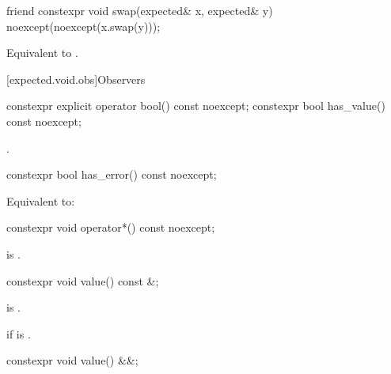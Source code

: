%
\begin{itemdecl}
friend constexpr void swap(expected& x, expected& y) noexcept(noexcept(x.swap(y)));
\end{itemdecl}

\begin{itemdescr}
\pnum
\effects
Equivalent to .
\end{itemdescr}

[expected.void.obs]{Observers}

%
%
\begin{itemdecl}
constexpr explicit operator bool() const noexcept;
constexpr bool has_value() const noexcept;
\end{itemdecl}

\begin{itemdescr}
\pnum
\returns
{}.
\end{itemdescr}

%
\begin{itemdecl}
constexpr bool has_error() const noexcept;
\end{itemdecl}

\begin{itemdescr}
\pnum
\effects
Equivalent to:
\end{itemdescr}

%
\begin{itemdecl}
constexpr void operator*() const noexcept;
\end{itemdecl}

\begin{itemdescr}
\pnum
\hardexpects
{} is .
\end{itemdescr}

%
\begin{itemdecl}
constexpr void value() const &;
\end{itemdecl}

\begin{itemdescr}
\pnum
\mandates
{} is .

\pnum
\throws
{} if  is .
\end{itemdescr}

%
\begin{itemdecl}
constexpr void value() &&;
\end{itemdecl}


